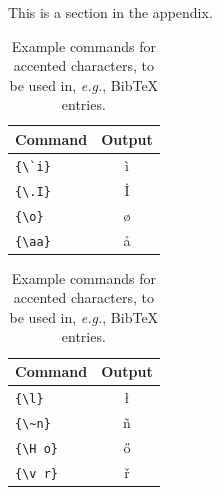 \documentclass[11pt]{article}
\begin{document}
This is a section in the appendix.
\begin{table}
	\centering
	\begin{tabular}{lc}
		\hline
		\textbf{Command} & \textbf{Output}\\
		\hline
		\verb|{\`i}| & {\`i} \\ 
		\verb|{\.I}| & {\.I} \\ 
		\verb|{\o}| & {\o} \\
		\verb|{\aa}| & {\aa}  \\\hline
	\end{tabular}
	\begin{tabular}{lc}
		\hline
		\textbf{Command} & \textbf{Output}\\
		\hline 
		\verb|{\l}| & {\l} \\ 
		\verb|{\~n}| & {\~n} \\ 
		\verb|{\H o}| & {\H o} \\ 
		\verb|{\v r}| & {\v r} \\ 
		\hline
	\end{tabular}
	\caption{Example commands for accented characters, to be used in, \emph{e.g.}, Bib\TeX{} entries.}
	\label{tab:accents}
\end{table}
\end{document}
